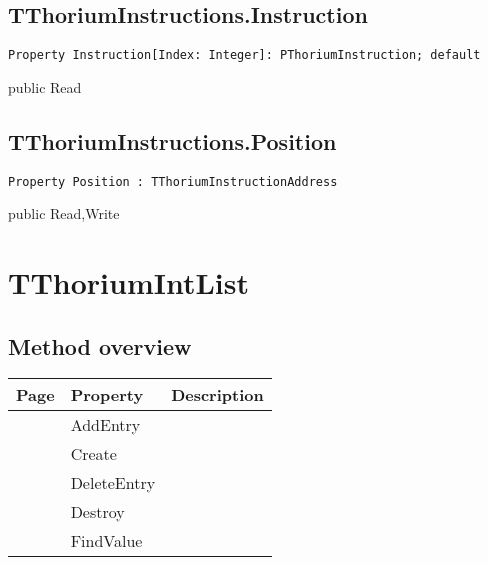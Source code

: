 \subsection{TThoriumInstructions.Instruction}
\label{thoriumcore:thorium:tthoriuminstructions:instruction}
\begin{FPCList}
\Synopsis
\Declaration 

\begin{verbatim}
Property Instruction[Index: Integer]: PThoriumInstruction; default
\end{verbatim}
\Visibility
public
\Access
Read
\Description
\end{FPCList}
\subsection{TThoriumInstructions.Position}
\label{thoriumcore:thorium:tthoriuminstructions:position}
\begin{FPCList}
\Synopsis
\Declaration 

\begin{verbatim}
Property Position : TThoriumInstructionAddress
\end{verbatim}
\Visibility
public
\Access
Read,Write
\Description
\end{FPCList}
\section{TThoriumIntList}
\label{thoriumcore:thorium:tthoriumintlist}
\subsection{Method overview}
\label{thoriumcore:thorium:tthoriumintlist:methods}
\begin{tabularx}{\textwidth}{llX}
Page & Property & Description  \\ \hline
\pageref{thoriumcore:thorium:tthoriumintlist:addentry} & AddEntry  &  \\
\pageref{thoriumcore:thorium:tthoriumintlist:create} & Create  &  \\
\pageref{thoriumcore:thorium:tthoriumintlist:deleteentry} & DeleteEntry  &  \\
\pageref{thoriumcore:thorium:tthoriumintlist:destroy} & Destroy  &  \\
\pageref{thoriumcore:thorium:tthoriumintlist:findvalue} & FindValue  &  \\
\hline
\end{tabularx}
